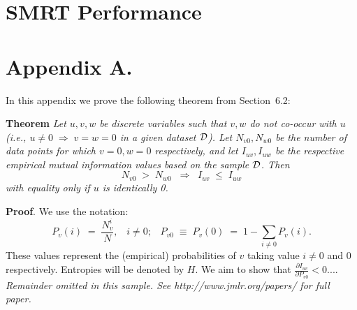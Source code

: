 \documentclass[twoside,11pt]{article}
\newcommand{\dataset}{{\cal D}}
\newcommand{\fracpartial}[2]{\frac{\partial #1}{\partial  #2}}
\begin{document}
\section{SMRT Performance}



\newpage

\appendix
\section*{Appendix A.}
\label{app:theorem}



In this appendix we prove the following theorem from
Section~6.2:

\noindent
{\bf Theorem} {\it Let $u,v,w$ be discrete variables such that $v, w$ do
not co-occur with $u$ (i.e., $u\neq0\;\Rightarrow \;v=w=0$ in a given
dataset $\dataset$). Let $N_{v0},N_{w0}$ be the number of data points for
which $v=0, w=0$ respectively, and let $I_{uv},I_{uw}$ be the
respective empirical mutual information values based on the sample
$\dataset$. Then
\[
  N_{v0} \;>\; N_{w0}\;\;\Rightarrow\;\;I_{uv} \;\leq\;I_{uw}
\]
with equality only if $u$ is identically 0.} \hfill\BlackBox

\noindent
{\bf Proof}. We use the notation:
\[
P_v(i) \;=\;\frac{N_v^i}{N},\;\;\;i \neq 0;\;\;\;
P_{v0}\;\equiv\;P_v(0)\; = \;1 - \sum_{i\neq 0}P_v(i).
\]
These values represent the (empirical) probabilities of $v$
taking value $i\neq 0$ and 0 respectively.  Entropies will be denoted
by $H$. We aim to show that $\fracpartial{I_{uv}}{P_{v0}} < 0$....\\

{\noindent \em Remainder omitted in this sample. See http://www.jmlr.org/papers/ for full paper.}


\vskip 0.2in

\newpage

\end{document}
